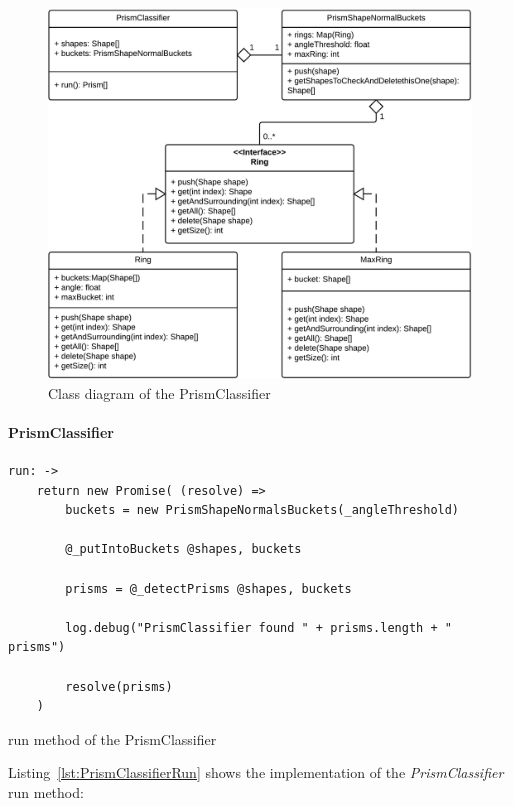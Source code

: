 \documentclass[../ClassicThesis.tex]{subfiles}
\begin{document}
\begin{figure}
\includegraphics[width=1.0\columnwidth]{Images/04-prismClassifier.png}
\caption{Class diagram of the PrismClassifier}
\label{fig:prismClassifierDiagram}
\end{figure}

\paragraph{PrismClassifier}

\begin{listing}[!h]
\centering
\begin{verbatim}
run: ->
    return new Promise( (resolve) =>
        buckets = new PrismShapeNormalsBuckets(_angleThreshold)

        @_putIntoBuckets @shapes, buckets

        prisms = @_detectPrisms @shapes, buckets

        log.debug("PrismClassifier found " + prisms.length + " prisms")

        resolve(prisms)
    )
\end{verbatim}
\caption{run method of the PrismClassifier}
\label{lst:PrismClassifierRun}
\end{listing}

Listing~\ref{lst:PrismClassifierRun} shows the implementation of the \emph{PrismClassifier} run method:
\end{document}
